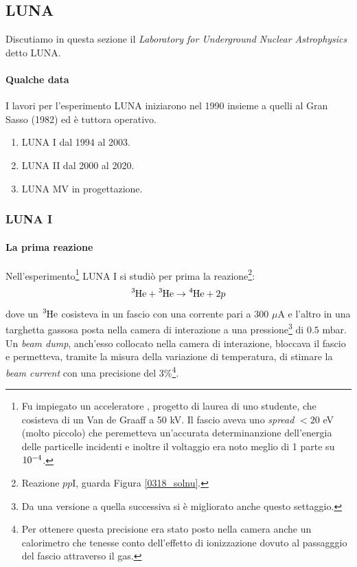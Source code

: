 \subsection{LUNA}\label{sec-LUNA}
Discutiamo in questa sezione il \textit{Laboratory for Underground Nuclear Astrophysics} detto LUNA.

\paragraph{Qualche data} 
I lavori per l'esperimento LUNA iniziarono nel 1990 insieme a quelli al Gran Sasso (1982) ed è tuttora operativo.
\begin{enumerate}
	\item LUNA I dal 1994 al 2003.
	\item LUNA II dal 2000 al 2020.
	\item LUNA MV in progettazione.
\end{enumerate}

\subsubsection{LUNA I}\label{sec-LUNA-I}
\paragraph{La prima reazione} Nell'esperimento\footnote{Fu impiegato un acceleratore \textit{}, progetto di laurea di uno studente, che cosisteva di un Van de Graaff a 50 kV. Il fascio aveva uno \textit{spread} $<20$ eV (molto piccolo) che peremetteva un'accurata determinanzione dell'energia delle particelle incidenti e inoltre il voltaggio era noto meglio di 1 parte su $10^{-4}$.} LUNA I si studiò per prima la reazione\footnote{Reazione $pp$I, guarda Figura \ref{0318_solnu}.}:
$$\ce{^3He} + \ce{^3He} \to \ce{^4He} + 2p$$
dove un $\ce{^3He}$ cosisteva in un fascio con una corrente pari a 300 $\mu$A e l'altro in una targhetta gassosa posta nella camera di interazione a una pressione\footnote{Da una versione a quella successiva si è migliorato anche questo settaggio.} di $0.5$ mbar. Un \textit{beam dump}, anch'esso collocato nella camera di interazione, bloccava il fascio e permetteva, tramite la misura della variazione di temperatura, di stimare la \textit{beam current} con una precisione del 3\%\footnote{Per ottenere questa precisione era stato posto nella camera anche un calorimetro che tenesse conto dell'effetto di ionizzazione dovuto al passagggio del fascio attraverso il gas.}.
\\

